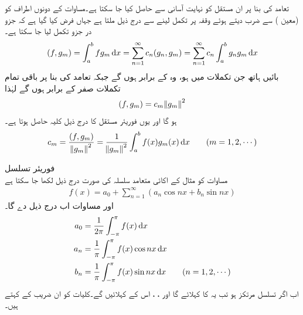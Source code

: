 تعامد کی بنا پر  ان مستقل کو نہایت آسانی سے حاصل کیا جا سکتا ہے۔مساوات  کے دونوں اطراف کو  (معین  ) سے ضرب دیتے ہوئے وقفہ  پر تکمل لینے سے درج ذیل ملتا ہے جہاں فرض کیا گیا ہے کہ جزو در جزو تکمل لیا جا سکتا ہے۔ 
\begin{align*}
(f,g_m)=\int_{a}^{b}fg_m\dif x=\sum_{n=1}^{\infty} c_n(g_n,g_m)=\sum_{n=1}^{\infty} c_n\int_{a}^{b} g_n g_m \dif x
\end{align*}
بائیں ہاتھ جن تکملات میں  ہو، وہ   کے برابر ہوں گے جبکہ تعامد کی بنا پر   باقی تمام تکملات صفر کے برابر ہوں گے لہٰذا
\begin{align}\label{مساوات_طاقتی_اضافی_فوریئر_عمومی_ب}
(f,g_m)=c_m\norm{g_m}^2
\end{align}
ہو گا اور یوں فوریئر مستقل کا درج ذیل کلیہ حاصل ہوتا ہے۔
\begin{align}\label{مساوات_طاقتی_اضافی_فوریئر_عمومی_پ}
c_m=\frac{(f,g_m)}{\norm{g_m}^2}=\frac{1}{\norm{g_m}^2}\int_{a}^{b} f(x)g_m(x)\dif x \quad \quad (m=1,2,\cdots)
\end{align}

\quad فوریئر تسلسل\\
مساوات  کو مثال  کے اکائی متعامد سلسلہ کی صورت درج ذیل لکھا جا سکتا ہے
\begin{align}\label{مساوات_طاقتی_اضافی_فوریئر_عمومی_ت}
f(x)=a_0+\sum_{n=1}^{\infty}(a_n\cos nx+b_n\sin nx)
\end{align}
اور مساوات  اب درج ذیل دے گا۔
\begin{gather}
\begin{aligned}\label{مساوات_طاقتی_اضافی_فوریئر_عمومی_ٹ}
a_0&=\frac{1}{2\pi}\int_{-\pi}^{\pi} f(x)\dif x\\
a_n&=\frac{1}{\pi}\int_{-\pi}^{\pi} f(x)\cos nx \dif x\\
b_n&=\frac{1}{\pi}\int_{-\pi}^{\pi}f(x)\sin nx \dif x\quad \quad (n=1,2,\cdots)
\end{aligned}
\end{gather} 
اب اگر تسلسل  مرتکز ہو تب یہ  کا  کہلائے گا اور ، ،  اس کے  کہلائیں گے۔کلیات  کو ان  ضریب  کے  کہتے ہیں۔

